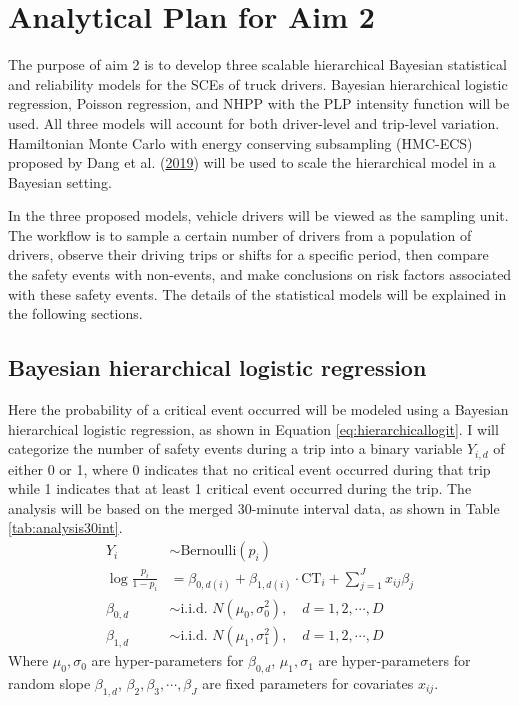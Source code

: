 \documentclass[12pt]{book}
\numberwithin{equation}{chapter}
\begin{document}
\hypertarget{analytical-plan-for-aim-2}{%
\section{Analytical Plan for Aim 2}\label{analytical-plan-for-aim-2}}

The purpose of aim 2 is to develop three scalable hierarchical Bayesian statistical and reliability models for the SCEs of truck drivers. Bayesian hierarchical logistic regression, Poisson regression, and NHPP with the PLP intensity function will be used. All three models will account for both driver-level and trip-level variation. Hamiltonian Monte Carlo with energy conserving subsampling (HMC-ECS) proposed by Dang et al. (\protect\hyperlink{ref-dang2019hamiltonian}{2019}) will be used to scale the hierarchical model in a Bayesian setting.

In the three proposed models, vehicle drivers will be viewed as the sampling unit. The workflow is to sample a certain number of drivers from a population of drivers, observe their driving trips or shifts for a specific period, then compare the safety events with non-events, and make conclusions on risk factors associated with these safety events. The details of the statistical models will be explained in the following sections.

\hypertarget{hierarchical-logit}{%
\subsection{Bayesian hierarchical logistic regression}\label{hierarchical-logit}}

Here the probability of a critical event occurred will be modeled using a Bayesian hierarchical logistic regression, as shown in Equation \eqref{eq:hierarchicallogit}. I will categorize the number of safety events during a trip into a binary variable \(Y_{i, d}\) of either 0 or 1, where 0 indicates that no critical event occurred during that trip while 1 indicates that at least 1 critical event occurred during the trip. The analysis will be based on the merged 30-minute interval data, as shown in Table \ref{tab:analysis30int}.
\begin{equation}
\begin{split}
Y_{i} &\sim \text{Bernoulli}(p_{i})\\
\log\frac{p_{i}}{1-p_{i}} &= \beta_{0, d(i)} + \beta_{1, d(i)} \cdot \text{CT}_i + \sum_{j=1}^{J} x_{ij}\beta_j\\
\beta_{0, d} &\sim \text{i.i.d. } N(\mu_0, \sigma_0^2), \quad d = 1, 2, \cdots, D\\
\beta_{1, d} &\sim \text{i.i.d. } N(\mu_1, \sigma_1^2), \quad d = 1, 2, \cdots, D
\label{eq:hierarchicallogit}
\end{split}
\end{equation}
Where \(\mu_0, \sigma_0\) are hyper-parameters for \(\beta_{0, d}\), \(\mu_1, \sigma_1\) are hyper-parameters for random slope \(\beta_{1, d}\), \(\beta_2, \beta_3, \cdots, \beta_J\) are fixed parameters for covariates \(x_{ij}\).
\end{document}
